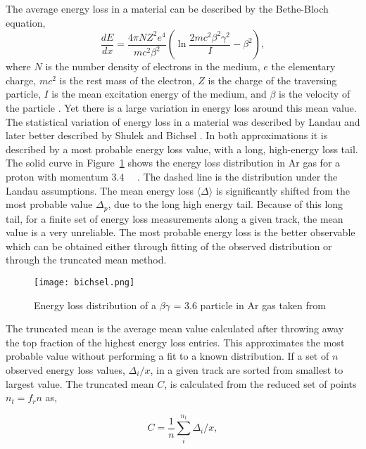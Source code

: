 The average energy loss in a material can be described by the Bethe-Bloch equation,
\begin{equation}\label{eq:bb}
\frac{dE}{dx} = \frac{4\pi NZ^2e^4}{mc^2\beta^2} (\ln \frac{2mc^2\beta^2\gamma^2}{I} - \beta^2),
\end{equation}
where $N$ is the number density of electrons in the medium, $e$ the elementary charge, $mc^2$ is the rest mass of the electron, $Z$ is the charge of the traversing particle, $I$ is the mean excitation energy of the medium, and $\beta$ is the velocity of the particle \cite{blumrol}. Yet there is a large variation in energy loss around this mean value. The statistical variation of energy loss in a material was described by Landau \cite{landau} and later better described by Shulek \cite{shulek} and Bichsel \cite{bichsel1}. In both approximations it is described by a most probable energy loss value, with a long, high-energy loss tail. The solid curve in Figure~\ref{fig:straggling} shows the energy loss distribution in Ar gas for a proton with momentum \SI{3.4}{\giga\eVperc} \cite{bichsel}. The dashed line is the distribution under the Landau assumptions. The mean energy loss $\langle\Delta\rangle$ is significantly shifted from the most probable value $\Delta_p$, due to the long high energy tail.  Because of this long tail, for a finite set of energy loss measurements along a given track, the mean value is a very unreliable. The most probable energy loss is the better observable which can be obtained either through fitting of the observed distribution or through the truncated mean method. 

\begin{figure}
\texttt{[image: bichsel.png]}
\caption{Energy loss distribution of a $\beta\gamma$ = 3.6 particle in Ar gas taken from \cite{bichsel}}
\label{fig:straggling}
\end{figure}

The truncated mean is the average mean value calculated after throwing away the top fraction of the highest energy loss entries. This approximates the most probable value without performing a fit to a known distribution. If a set of $n$ observed energy loss values, $\Delta_i/x$, in a given track are sorted from smallest to largest value. The truncated mean $C$, is calculated from the reduced set of points $n_t = f_r n$ as,

\begin{equation}
C = \frac{1}{n} \sum\limits_{i}^{n_t} \Delta_i/x,
\label{eq:truncmean}
\end{equation}

